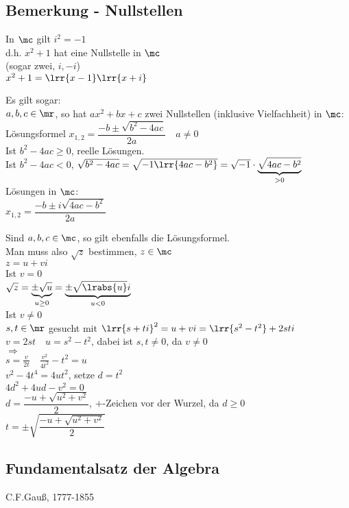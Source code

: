 \subsection{Bemerkung - Nullstellen}
		\item In $\mc$ gilt $i^2=-1$\\
			d.h. $x^2+1$ hat eine Nullstelle in $\mc$\\
			(sogar zwei, $i,-i$)\\
			$x^2+1=\lrr{x-1}\lrr{x+i}$
			
			Es gilt sogar:\\
			$a,b,c\in\mr$, so hat $ax^2+bx+c$ zwei Nullstellen (inklusive Vielfachheit) in $\mc$:\\
			Lösungsformel $x_{1,2}=\dfrac{-b\pm\sqrt{b^2-4ac}}{2a}\quad a\neq 0$\\
			Ist $b^2-4ac\geq 0$, reelle Lösungen.\\
			Ist $b^2-4ac <0$, $\sqrt{b^2-4ac}=\sqrt{-1\lrr{4ac-b^2}}=\sqrt{-1}\cdot \underbrace{\sqrt{4ac-b^2}}_{>0}$\\
			Lösungen in $\mc$:\\
			$x_{1,2} =\dfrac{-b\pm i\sqrt{4ac-b^2}}{2a}$
		\item Sind $a,b,c \in \mc$, so gilt ebenfalls die Lösungsformel.\\
			Man muss also $\sqrt{z}$ bestimmen, $z\in\mc$\\
			$z=u+vi$\\
			Ist $v=0$\\
			$\sqrt{z}=\underbrace{\pm\sqrt{u}}_{u\geq 0}=\underbrace{\pm\sqrt{\lrabs{u}}i}_{u<0}$\\
			Ist $v\neq 0$\\
			$s,t\in\mr$ gesucht mit $\lrr{s+ti}^2=u+vi=\lrr{s^2-t^2}+2sti$\\
			$v=2st\quad u=s^2-t^2$, dabei ist $s,t\neq 0$, da $v\neq 0$\\
			$\Rightarrow$\\
			$s=\frac{v}{2t}\quad\frac{v^2}{4t^2}-t^2=u$\\
			$v^2-4t^4=4ut^2$, setze $d=t^2$\\
			$4d^2+4ud-v^2=0$\\
			$d=\dfrac{-u+\sqrt{u^2+v^2}}{2}$, $+$-Zeichen vor der Wurzel, da $d\geq 0$\\
			$t=\pm\sqrt{\dfrac{-u+\sqrt{u^2+v^2}}{2}}$
	\subExEnd

\subsection{Fundamentalsatz der Algebra}
	C.F.Gauß, 1777-1855
	
